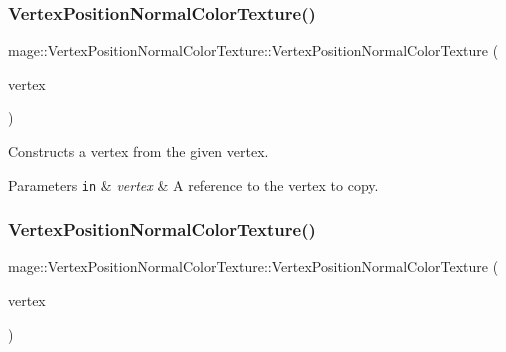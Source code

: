 \subsubsection{\texorpdfstring{Vertex\+Position\+Normal\+Color\+Texture()}{VertexPositionNormalColorTexture()}\hspace{0.1cm}{\footnotesize\ttfamily [3/4]}}
{\footnotesize\ttfamily mage\+::\+Vertex\+Position\+Normal\+Color\+Texture\+::\+Vertex\+Position\+Normal\+Color\+Texture (\begin{DoxyParamCaption}\item[{const \hyperlink{structmage_1_1_vertex_position_normal_color_texture}{Vertex\+Position\+Normal\+Color\+Texture} \&}]{vertex }\end{DoxyParamCaption})\hspace{0.3cm}{\ttfamily [default]}}

Constructs a vertex from the given vertex.


\begin{DoxyParams}[1]{Parameters}
\mbox{\tt in}  & {\em vertex} & A reference to the vertex to copy. \\
\hline
\end{DoxyParams}
\hypertarget{structmage_1_1_vertex_position_normal_color_texture_aa23061d16a1c231debc79d44db8f0a6e}{}\label{structmage_1_1_vertex_position_normal_color_texture_aa23061d16a1c231debc79d44db8f0a6e} 
\subsubsection{\texorpdfstring{Vertex\+Position\+Normal\+Color\+Texture()}{VertexPositionNormalColorTexture()}\hspace{0.1cm}{\footnotesize\ttfamily [4/4]}}
{\footnotesize\ttfamily mage\+::\+Vertex\+Position\+Normal\+Color\+Texture\+::\+Vertex\+Position\+Normal\+Color\+Texture (\begin{DoxyParamCaption}\item[{\hyperlink{structmage_1_1_vertex_position_normal_color_texture}{Vertex\+Position\+Normal\+Color\+Texture} \&\&}]{vertex }\end{DoxyParamCaption})\hspace{0.3cm}{\ttfamily [default]}}

